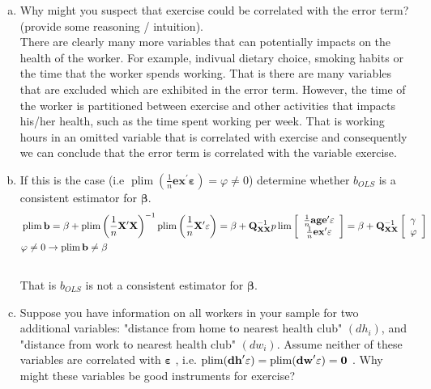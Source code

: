 \documentclass[11pt,reqno]{amsart}\usepackage[]{graphicx}\usepackage[]{color}
\newcommand{\mlt}[1]{\mathbf{#1}} %
\newcommand{\mgr}[1]{\mathbf{#1}}%
\newcommand{\ksp}{\vspace{0.1in}}   %
\newcommand{\kbeta}{\mgr{\beta}}
\newcommand{\kt}{^{\prime}}
\newcommand{\kX}{\mlt{X}}
\begin{document}
\ksp
\begin{enumerate}[(a)]
\item  Why might you suspect that exercise could be correlated with the error term? (provide some reasoning / intuition).\\


There are clearly many more variables that can potentially impacts on the health of the worker. For example, indivual dietary choice, smoking habits or the time that the worker spends working. That is there are many variables that are excluded which are exhibited in the error term. However, the time of the worker is partitioned between exercise and other activities that impacts his/her health, such as the time spent working per week. That is working hours in an omitted variable that is correlated with exercise and consequently we can conclude that the error term is correlated with the variable exercise.

\ksp
\item If this is the case (i.e $\operatorname{plim}\left(\frac{1}{n} \mlt{ex}^{\prime} \mlt{\varepsilon}\right)=\varphi \neq 0$) determine whether $b_{OLS}$ is a consistent estimator for $\kbeta$.\\

\begin{equation*}
\begin{split}
& \operatorname{plim} \mlt{b}=\kbeta+ \operatorname{plim} \left(\frac{1}{n} \kX\kt\kX\right)^{-1} \operatorname{plim} \left(\frac{1}{n} \mlt{X}^{\prime} \varepsilon\right)=\beta+\mlt{Q}_{\mlt{X} \mlt{X}}^{-1} p \lim \left[\begin{array}{c}
  \frac{1}{n}\bold{age}\kt\mgr{\varepsilon}  \\
  \frac{1}{n}\bold{ex}\kt\mgr{\varepsilon}  \\
\end{array}\right]=\kbeta+\mlt{Q}_{\mlt{X} \mlt{X}}^{-1}\left[\begin{array}{l}
\mgr{\gamma} \\
\mgr{\varphi}
\end{array}\right]\\
& \varphi\neq 0 \rightarrow \operatorname{plim}\bold{b}\neq \kbeta
\end{split}
\end{equation*}\\



That is $b_{OLS}$ is not a consistent estimator for $\kbeta$.

\ksp
\item Suppose you have information on all workers in your sample for two additional variables: "distance from home to nearest health club" $(dh_i)$, and "distance from work to nearest health club" $(dw_i)$.
Assume neither of these variables are correlated with $\mgr{\varepsilon}$ , i.e. $\operatorname{plim} (\bold{dh}\kt \mgr{\varepsilon} ) = \operatorname{plim} (\bold{dw}\kt \mgr{\varepsilon} ) = \mlt{0}$ . Why might these variables be good instruments for exercise?\\


\end{enumerate}
\end{document}
